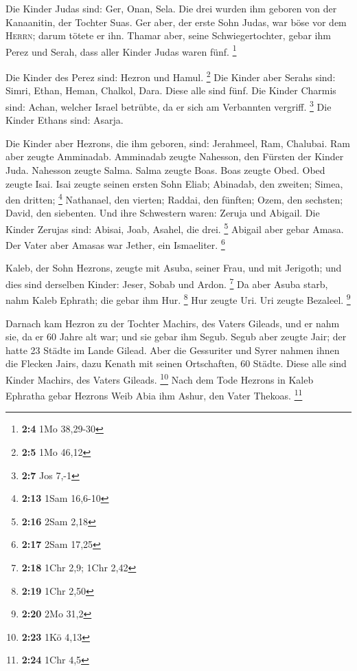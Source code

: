 Die Kinder Judas sind: Ger, Onan, Sela. Die drei wurden
ihm geboren von der Kanaanitin, der Tochter Suas. Ger aber, der erste
Sohn Judas, war böse vor dem \textsc{Herrn}; darum tötete er ihn.
 Thamar aber, seine Schwiegertochter, gebar ihm Perez und
Serah, dass aller Kinder Judas waren fünf. \footnote{\textbf{2:4} 1Mo
  38,29-30}

 Die Kinder des Perez sind: Hezron und Hamul. \footnote{\textbf{2:5}
  1Mo 46,12}  Die Kinder aber Serahs sind: Simri, Ethan,
Heman, Chalkol, Dara. Diese alle sind fünf.  Die Kinder
Charmis sind: Achan, welcher Israel betrübte, da er sich am Verbannten
vergriff. \footnote{\textbf{2:7} Jos 7,-1}  Die Kinder
Ethans sind: Asarja.

 Die Kinder aber Hezrons, die ihm geboren, sind:
Jerahmeel, Ram, Chalubai.  Ram aber zeugte Amminadab.
Amminadab zeugte Nahesson, den Fürsten der Kinder Juda. 
Nahesson zeugte Salma. Salma zeugte Boas.  Boas zeugte
Obed. Obed zeugte Isai.  Isai zeugte seinen ersten Sohn
Eliab; Abinadab, den zweiten; Simea, den dritten; \footnote{\textbf{2:13}
  1Sam 16,6-10}  Nathanael, den vierten; Raddai, den
fünften;  Ozem, den sechsten; David, den siebenten.
 Und ihre Schwestern waren: Zeruja und Abigail. Die
Kinder Zerujas sind: Abisai, Joab, Asahel, die drei. \footnote{\textbf{2:16}
  2Sam 2,18}  Abigail aber gebar Amasa. Der Vater aber
Amasas war Jether, ein Ismaeliter. \footnote{\textbf{2:17} 2Sam 17,25}

 Kaleb, der Sohn Hezrons, zeugte mit Asuba, seiner Frau,
und mit Jerigoth; und dies sind derselben Kinder: Jeser, Sobab und
Ardon. \footnote{\textbf{2:18} 1Chr 2,9; 1Chr 2,42}  Da
aber Asuba starb, nahm Kaleb Ephrath; die gebar ihm Hur. \footnote{\textbf{2:19}
  1Chr 2,50}  Hur zeugte Uri. Uri zeugte Bezaleel.
\footnote{\textbf{2:20} 2Mo 31,2}

 Darnach kam Hezron zu der Tochter Machirs, des Vaters
Gileads, und er nahm sie, da er 60 Jahre alt war; und sie gebar ihm
Segub.  Segub aber zeugte Jair; der hatte 23 Städte im
Lande Gilead.  Aber die Gessuriter und Syrer nahmen ihnen
die Flecken Jairs, dazu Kenath mit seinen Ortschaften, 60 Städte. Diese
alle sind Kinder Machirs, des Vaters Gileads. \footnote{\textbf{2:23}
  1Kö 4,13}  Nach dem Tode Hezrons in Kaleb Ephratha
gebar Hezrons Weib Abia ihm Ashur, den Vater Thekoas. \footnote{\textbf{2:24}
  1Chr 4,5}

